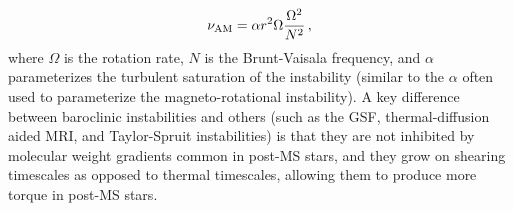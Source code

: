 \begin{equation}
\label{numri} 
\nu_{\rm AM} = \alpha r^2 \Omega \frac{\Omega^2}{N^2} \, ,

\end{equation}
where $\Omega$ is the rotation rate, $N$ is the Brunt-Vaisala frequency, and $\alpha$ parameterizes the turbulent saturation of the instability (similar to the $\alpha$ often used to parameterize the magneto-rotational instability). A key difference between baroclinic instabilities and others (such as the GSF, thermal-diffusion aided MRI, and Taylor-Spruit instabilities) is that they are not inhibited by molecular weight gradients common in post-MS stars, and they grow on shearing timescales as opposed to thermal timescales, allowing them to produce more torque in post-MS stars.